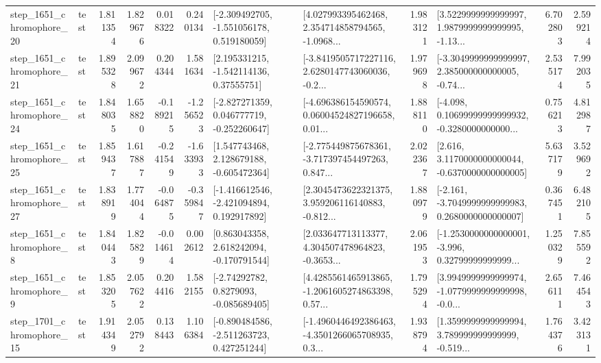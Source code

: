 \begin{tabular}{llrrrrllrlrr}
 step\_1651\_chromophore\_20 &      test &      1.811354 &    1.829676 &      0.018322 &  0.240134 &   [-2.309492705, -1.551056178, 0.519180059] &  [4.027993395462468, 2.354714858794565, -1.0968... &       1.983121 &  [3.5229999999999997, 1.9879999999999995, -1.13... &            6.702803 &          2.599214 \\
 step\_1651\_chromophore\_21 &      test &      1.895328 &    2.099672 &      0.204344 &  1.581634 &     [2.195331215, -1.542114136, 0.37555751] &  [-3.8419505717227116, 2.6280147743060036, -0.2... &       1.979698 &  [-3.3049999999999997, 2.385000000000005, -0.74... &            2.535174 &          7.992035 \\
 step\_1651\_chromophore\_24 &      test &      1.848035 &    1.658820 &     -0.189215 & -1.256523 &   [-2.827271359, 0.046777719, -0.252260647] &  [-4.696386154590574, 0.06004524827196658, 0.01... &       1.888110 &  [-4.098, 0.10699999999999932, -0.3280000000000... &            0.756213 &          4.812987 \\
 step\_1651\_chromophore\_25 &      test &      1.859437 &    1.617887 &     -0.241549 & -1.633933 &    [1.547743468, 2.128679188, -0.605472364] &  [-2.775449875678361, -3.717397454497263, 0.847... &       2.022367 &   [2.616, 3.1170000000000044, -0.6370000000000005] &            5.637179 &          3.529692 \\
 step\_1651\_chromophore\_27 &      test &      1.838919 &    1.774044 &     -0.064875 & -0.359847 &   [-1.416612546, -2.421094894, 0.192917892] &  [2.3045473622321375, 3.959206116140883, -0.812... &       1.880979 &  [-2.161, -3.7049999999999983, 0.2680000000000007] &            0.367451 &          6.482105 \\
  step\_1651\_chromophore\_8 &      test &      1.840443 &    1.825829 &     -0.014614 &  0.002612 &    [0.863043358, 2.618242094, -0.170791544] &  [2.033647713113377, 4.304507478964823, -0.3653... &       2.061953 &  [-1.2530000000000001, -3.996, 0.32799999999999... &            1.250329 &          7.855592 \\
  step\_1651\_chromophore\_9 &      test &      1.853205 &    2.057622 &      0.204416 &  1.582155 &      [-2.74292782, 0.8279093, -0.085689405] &  [4.4285561465913865, -1.2061605274863398, 0.57... &       1.795294 &  [3.9949999999999974, -1.0779999999999998, -0.0... &            2.656111 &          7.464543 \\
 step\_1701\_chromophore\_15 &      test &      1.914349 &    2.052792 &      0.138443 &  1.106384 &   [-0.890484586, -2.511263723, 0.427251244] &  [-1.4960446492386463, -4.3501266065708935, 0.3... &       1.938794 &  [1.3599999999999994, 3.789999999999999, -0.519... &            1.764376 &          3.423131 \\

\end{tabular}

